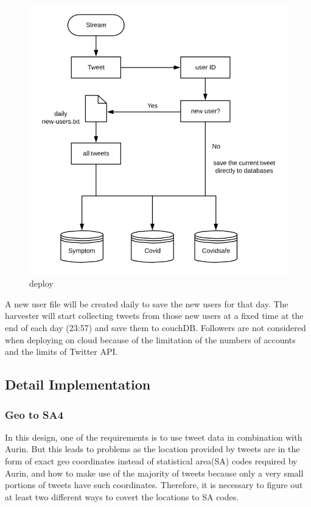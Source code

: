 \begin{figure}[H]
\centering
\includegraphics[scale=0.4]{city_analytics/report/images/deployment.png}
\caption{deploy}
\label{fig:stream}
\end{figure}

A new user file will be created daily to save the new users for that day. The harvester will start collecting tweets from those new users at a fixed time at the end of each day (23:57) and save them to couchDB. Followers are not considered when deploying on cloud because of the limitation of the numbers of accounts and the limits of Twitter API.

\subsection{Detail Implementation}

\subsubsection{Geo to SA4}
In this design, one of the requirements is to use tweet data in combination with Aurin. But this leads to problems as the location provided by tweets are in the form of exact geo coordinates instead of statistical area(SA) codes required by Aurin, and how to make use of the majority of tweets because only a very small portions of tweets have such coordinates. Therefore, it is necessary to figure out at least two different ways to covert the locations to SA codes.


